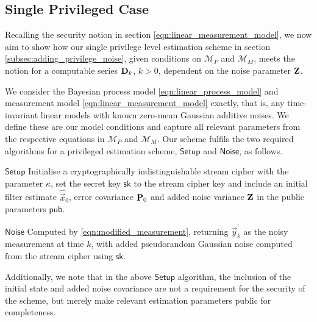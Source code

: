 \documentclass[letterpaper, 10 pt, conference]{IEEEtran}
\theoremstyle{definition}
\begin{document}
\subsection{Single Privileged Case}
Recalling the security notion in section \eqref{eqn:linear_measurement_model}, we now aim to show how our single privilege level estimation scheme in section \ref{subsec:adding_privilege_noise}, given conditions on $\mathcal{M}_P$ and $\mathcal{M}_M$, meets the notion for a computable series ${{\mathbf{D}}}_k$, $k>0$, dependent on the noise parameter ${{\mathbf{Z}}}$.

We consider the Bayesian process model \eqref{eqn:linear_process_model} and measurement model \eqref{eqn:linear_measurement_model} exactly, that is, any time-invariant linear models with known zero-mean Gaussian additive noises. We define these are our model conditions and capture all relevant parameters from the respective equations in $\mathcal{M}_P$ and $\mathcal{M}_M$. Our scheme fulfils the two required algorithms for a privileged estimation scheme, $\mathsf{Setup}$ and $\mathsf{Noise}$, as follows.
\begin{LaTeXdescription}
   \item[$\mathsf{Setup}$] Initialise a cryptographically indistinguishable stream cipher with the parameter $\kappa$, set the secret key $\mathsf{sk}$ to the stream cipher key and include an initial filter estimate $\hat{\vec{x}}_0$, error covariance ${{\mathbf{P}}}_0$ and added noise variance ${{\mathbf{Z}}}$ in the public parameters $\mathsf{pub}$.
   \item[$\mathsf{Noise}$] Computed by \eqref{eqn:modified_measurement}, returning $\vec{y}^\prime_k$ as the noisy measurement at time $k$, with added pseudorandom Gaussian noise computed from the stream cipher using $\mathsf{sk}$.
\end{LaTeXdescription}
Additionally, we note that in the above $\mathsf{Setup}$ algorithm, the inclusion of the initial state and added noise covariance are not a requirement for the security of the scheme, but merely make relevant estimation parameters public for completeness.
\end{document}
